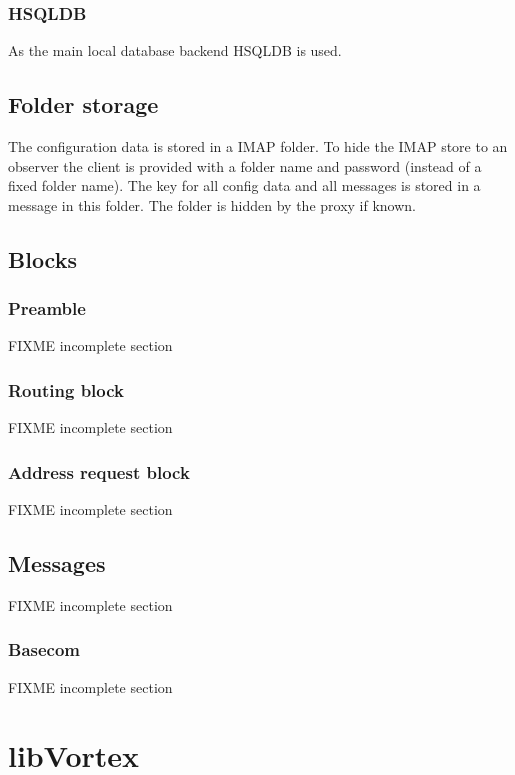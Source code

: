 \subsubsection{HSQLDB}
As the main local database backend HSQLDB is used. 

\subsection{Folder storage}
The configuration data is stored in a IMAP folder. To hide the IMAP store to an observer the client is provided with a folder name and password (instead of a fixed folder name). The key for all config data and all messages is stored in a message in this folder. The folder is hidden by the proxy if known.

\subsection{Blocks}
\subsubsection{Preamble}
FIXME incomplete section

\subsubsection{Routing block}
FIXME incomplete section

\subsubsection{Address request block}
FIXME incomplete section

\subsection{Messages}
FIXME incomplete section

\subsubsection{Basecom}
FIXME incomplete section

\section{libVortex}